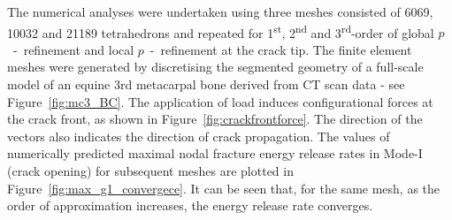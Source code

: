 \documentclass[onecolumn]{svjour3}
\begin{document}
The numerical analyses were undertaken using three meshes consisted of 6069, 10032 and 21189 tetrahedrons and repeated for 1\textsuperscript{st}, 2\textsuperscript{nd} and 3\textsuperscript{rd}-order of global $p$~-~refinement and local $p$~-~refinement at the crack tip. The finite element meshes were generated by discretising the segmented geometry of a full-scale model of an equine 3rd metacarpal bone derived from CT scan data - see Figure~\ref{fig:mc3_BC}.
% 
The application of load induces configurational forces at the crack front, as shown in Figure~\ref{fig:crackfrontforce}. 
The direction of the vectors also indicates the direction of crack propagation.
The values of numerically predicted maximal nodal fracture energy release rates in Mode-I (crack opening) for subsequent meshes are plotted in Figure~\ref{fig:max_g1_convergece}. 
It can be seen that, for the same mesh, as the order of approximation increases, the energy release rate converges. 
% 		
\end{document}
